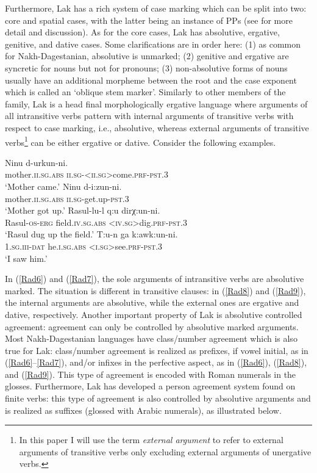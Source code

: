 \documentclass[output=paper]{langscibook}
\begin{document}
Furthermore, Lak has a rich system of case marking which can be split into two: core and spatial cases, with the latter being an instance of PPs (see \citet{Radkevich2010} for more detail and discussion). As for the core cases, Lak has absolutive, ergative, genitive, and dative cases. Some clarifications are in order here: (1) as common for Nakh-Dagestanian, absolutive is unmarked; (2) genitive and ergative are syncretic for nouns but not for pronouns; (3) non-absolutive forms of nouns usually have an additional morpheme between the root and the case exponent which is called an ‘oblique stem marker’.
Similarly to other members of the family, Lak is a head final morphologically ergative language where arguments of all intransitive verbs pattern with internal arguments of transitive verbs with respect to case marking, i.e., absolutive, whereas external arguments of transitive verbs\footnote{In this paper I will use the term \emph{external argument} to refer to external arguments of transitive verbs only excluding external arguments of unergative verbs.} can be either ergative or dative. Consider the following examples.\largerpage[1.75]

\ea\label{Rad6}
\gll Ninu d-urkun-ni.\\
mother.\textsc{ii.sg.abs} \textsc{ii.sg}-\textsc{<ii.sg>}come.\textsc{prf}-\textsc{pst.3}\\
\glt ‘Mother came.’
\ex\label{Rad7}
\gll Ninu d-i:zun-ni.\\
mother.\textsc{ii.sg.abs} \textsc{ii.sg}-get.up-\textsc{pst.3}\\
\glt ‘Mother got up.’
\ex\label{Rad8}
\gll Rasul-lu-l q:u dirχ:un-ni.\\
Rasul-\textsc{os-erg} field.\textsc{iv.sg.abs} \textsc{<iv.sg>}dig.\textsc{prf-pst.3}\\
\glt ‘Rasul dug up the field.’
\ex\label{Rad9}
\gll T:u-n ga k:awk:un-ni.\\ 
\textsc{1.sg.iii-dat} he.\textsc{i.sg.abs} \textsc{<i.sg>}see.\textsc{prf-pst.3}\\
\glt ‘I saw him.’
\z

In (\ref{Rad6}) and (\ref{Rad7}), the sole arguments of intransitive verbs are absolutive marked. 
The situation is different in transitive clauses: 
in (\ref{Rad8}) and (\ref{Rad9}), the internal arguments are absolutive, while the external ones are ergative and dative, respectively. 
Another important property of Lak is absolutive controlled agreement: agreement can only be controlled by absolutive marked arguments. 
Most Nakh-Dagestanian languages have class/number agreement which is also true for Lak: 
class/number agreement is realized as prefixes, if vowel initial, as in (\ref{Rad6}--\ref{Rad7}), 
and/or infixes in the perfective aspect, as in (\ref{Rad6}), (\ref{Rad8}), and (\ref{Rad9}). 
This type of agreement is encoded with Roman numerals in the glosses. 
Furthermore, Lak has developed a person agreement system found on finite verbs: 
this type of agreement is also controlled by absolutive arguments and is realized as suffixes (glossed with Arabic numerals), as illustrated below.
\end{document}

